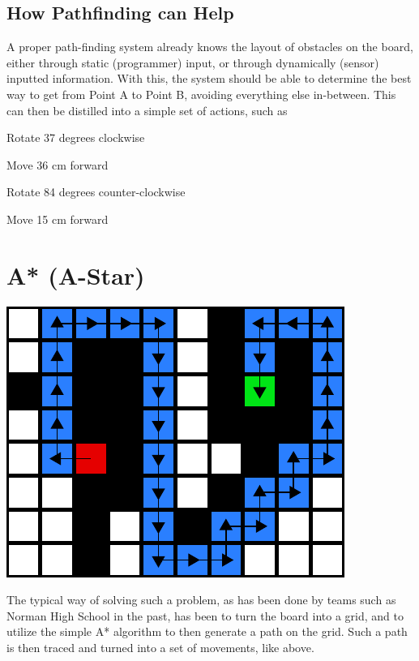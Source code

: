 \documentclass[letterpaper, 12pt]{article}
\begin{document}
\begin{multicols}{2}
\subsection{How Pathfinding can Help}

A proper path-finding system already knows the layout of obstacles on the board,
either through static (programmer) input, or through dynamically (sensor)
inputted information. With this, the system should be able to determine the best
way to get from Point A to Point B, avoiding everything else in-between. This
can then be distilled into a simple set of actions, such as

\begin{enumerate*}
    \item Rotate 37 degrees clockwise
    \item Move 36 cm forward
    \item Rotate 84 degrees counter-clockwise
    \item Move 15 cm forward
\end{enumerate*}

\section{A* (A-Star)}

\includegraphics[width=\columnwidth]{img/a_star.pdf}

The typical way of solving such a problem, as has been done by teams such as
Norman High School in the past, has been to turn the board into a grid, and to
utilize the simple A* algorithm to then generate a path on the grid. Such a path
is then traced and turned into a set of movements, like above.


\end{multicols}
\end{document}
